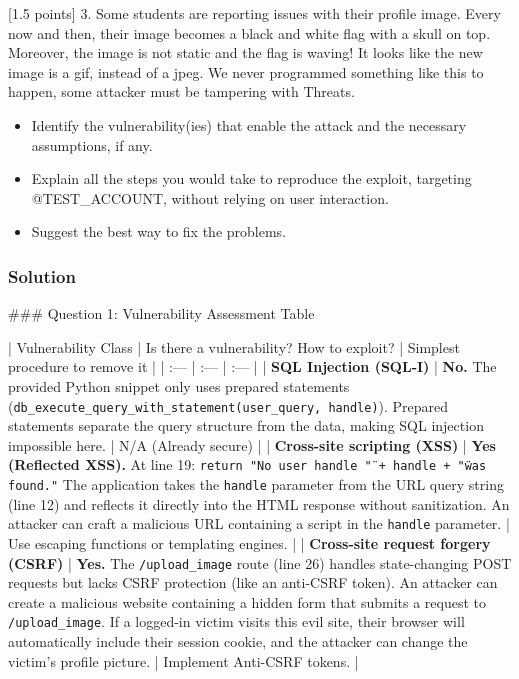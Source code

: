 \documentclass{article}
\begin{document}
[1.5 points] 3. Some students are reporting issues with their profile image. Every now and then, their image becomes a black and white flag with a skull on top. Moreover, the image is not static and the flag is waving! It looks like the new image is a gif, instead of a jpeg. We never programmed something like this to happen, some attacker must be tampering with Threats.
\begin{itemize}
    \item[\textbf{1.}] Identify the vulnerability(ies) that enable the attack and the necessary assumptions, if any.
    \item[\textbf{2.}] Explain all the steps you would take to reproduce the exploit, targeting @TEST\_ACCOUNT, without relying on user interaction.
    \item[\textbf{3.}] Suggest the best way to fix the problems.
\end{itemize}

\subsubsection*{Solution}
\#\#\# Question 1: Vulnerability Assessment Table

| Vulnerability Class | Is there a vulnerability? How to exploit? | Simplest procedure to remove it |
| :--- | :--- | :--- |
| \textbf{SQL Injection (SQL-I)} | \textbf{No.} The provided Python snippet only uses prepared statements (\texttt{db\_execute\_query\_with\_statement(user\_query, handle)}). Prepared statements separate the query structure from the data, making SQL injection impossible here. | N/A (Already secure) |
| \textbf{Cross-site scripting (XSS)} | \textbf{Yes (Reflected XSS).} At line 19: \texttt{return "No user handle \"" + handle + "\" was found."} The application takes the \texttt{handle} parameter from the URL query string (line 12) and reflects it directly into the HTML response without sanitization. An attacker can craft a malicious URL containing a script in the \texttt{handle} parameter. | Use escaping functions or templating engines. |
| \textbf{Cross-site request forgery (CSRF)} | \textbf{Yes.} The \texttt{/upload\_image} route (line 26) handles state-changing POST requests but lacks CSRF protection (like an anti-CSRF token). An attacker can create a malicious website containing a hidden form that submits a request to \texttt{/upload\_image}. If a logged-in victim visits this evil site, their browser will automatically include their session cookie, and the attacker can change the victim's profile picture. | Implement Anti-CSRF tokens. |
\end{document}
